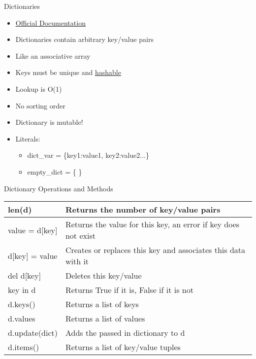 % 
% 
% 
\begin{Slide}{Dictionaries}
  \begin{itemize}
  \item \underline{\href{https://docs.python.org/3/library/stdtypes.html\#mapping-types-dict}{Official Documentation}}
  \item Dictionaries contain arbitrary key/value pairs
  \item Like an associative array
  \item Keys must be unique and \underline{\href{https://docs.python.org/3/glossary.html\#term-hashable}{hashable}}
  \item Lookup is O(1)
  \item No sorting order
  \item Dictionary is mutable!
  \item Literals:
    \begin{itemize}
    \item dict\_var = \{key1:value1, key2:value2...\}
    \item empty\_dict = \{ \}
    \end{itemize}

  \end{itemize}
\end{Slide}

% 
% 
% 
\begin{Slide}{Dictionary Operations and Methods}


  \begin{table}[h]
    \begin{tabular}{|l|p{8cm}|} \hline
      len(d)    & Returns the number of key/value pairs \\ \hline
      value = d[key]    & Returns the value for this key, an error if key does not exist \\ \hline
      d[key] = value & Creates or replaces this key and associates this data with it\\ \hline
      del d[key] & Deletes this key/value \\ \hline
      key in d & Returns True if it is, False if it is not \\ \hline
      d.keys() & Returns a list of keys \\ \hline
      d.values & Returns a list of values \\ \hline
      d.update(dict) & Adds the passed in dictionary to d \\ \hline
      d.items() & Returns a list of key/value tuples \\ \hline
    \end{tabular}
  \end{table}

\end{Slide}


